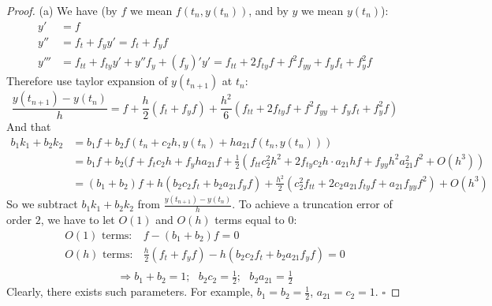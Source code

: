 \documentclass[a4paper, 10pt]{article}
\theoremstyle{definition}
\theoremstyle{hSol}
\begin{document}
\begin{proof} (a) We have (by $f$ we mean $f(t_n, y(t_n))$, and by $y$ we mean $y(t_n)$):
\begin{equation}
  \begin{split}
    y'&=f \\
    y'' &= f_t + f_yy' = f_t + f_y f\\
    y'''&=f_{tt} + f_{ty} y' + y''f_y + (f_y)'y' = f_{tt}+2f_{ty}f+f^2 f_{yy}+f_y f_t + f_y^2 f
  \end{split}
\end{equation}
Therefore use taylor expansion of $y(t_{n+1})$ at $t_n$: 
\begin{equation}
  \frac{y(t_{n+1}) - y(t_n)}{h} = f + \frac{h}{2}(f_t + f_y f) + \frac{h^2}{6}(f_{tt}+2f_{ty}f+f^2 f_{yy}+f_y f_t + f_y^2 f)  
\end{equation}
And that
\begin{equation}
  \begin{split}
    b_1 k_1 + b_2 k_2 &= b_1 f + b_2 f(t_n + c_2 h, y(t_n) + ha_{21}f(t_n, y(t_n))) \\
    &= b_1 f + b_2 (f + f_t c_2 h + f_y ha_{21}f + \tfrac{1}{2}(f_{tt}c_2^2h^2+2f_{ty} c_2 h \cdot a_{21}hf + f_{yy}h^2 a_{21}^2 f^2+O(h^3)) \\
    &= (b_1 + b_2)f + h(b_2 c_2 f_t + b_2 a_{21}f_yf) + \tfrac{h^2}{2}(c_2^2 f_{tt}+2c_2a_{21}f_{ty}f+a_{21}f_{yy}f^2) + O(h^3)
  \end{split}
\end{equation}
So we subtract $b_1 k_1 + b_2 k_2$ from $\frac{y(t_{n+1})-y(t_n)}{h}$. To achieve a truncation error of order $2$, we have to let $O(1)$ and $O(h)$ terms equal to 0:
\begin{equation}
  \begin{split}
    O(1)\text{ terms}: & f  - (b_1 + b_2)f = 0 \\
    O(h)\text{ terms}: & \frac{h}{2}(f_t + f_y f)  - h(b_2 c_2 f_t + b_2 a_{21}f_yf) = 0 \\
  \end{split}
\end{equation}
$$
  \Rightarrow b_1 + b_2 = 1;~~~b_2 c_2 = \tfrac{1}{2};~~~b_2 a_{21}=\tfrac{1}{2}
$$
Clearly, there exists such parameters. For example, $b_1 = b_2 = \frac{1}{2}$, $a_{21}=c_2=1$. $\square$


\end{proof}
\end{document}
